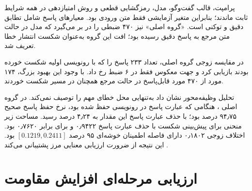 پرامپت، قالب گفت‌وگو، مدل، رمزگشایی قطعی و روش امتیازدهی در
همه شرایط ثابت ماندند؛ بنابراین متغیر آزمایشی فقط متن ورودی
 بود. معیارهای پاسخ شامل تطابق دقیق و  توکنی است.
«گروه اصلی» نیز ۴۷۰ ضبطی را در بر می‌گیرد که مدل در حالت متن
مرجع به پاسخ دقیق رسیده بود؛ افت این گروه به‌عنوان شکست انتشار
خطا تعریف شد.

\begin{table}[H]
\centering
\caption{مقایسه زوجی انتشار خطا در ۷۶۹ ضبط فارسی }
\label{tab:propagation_results}
\end{table}

در مقایسه زوجی گروه اصلی،  تعداد ۲۳۳ پاسخ را که با
رونویسی اولیه شکست خورده بودند بازیابی کرد و جهت معکوس فقط در
۶ ضبط رخ داد. با وجود این بهبود بزرگ، ۱۷۴ مورد از ۴۷۰ مورد
قابل‌پاسخ در حالت مرجع همچنان در مسیر  شکست خوردند.

تحلیل وظیفه‌محور نشان داد  به‌تنهایی محل خطای مهم را
توصیف نمی‌کند. در گروه اصلی ، هنگامی که عبارت پاسخ در
رونویسی حفظ شده بود، نرخ حفظ پاسخ صحیح ۹۴٫۷۵ درصد بود؛ با حذف
عبارت پاسخ این مقدار به ۴٫۲۴ درصد رسید. مساحت زیر منحنی برای
پیش‌بینی شکست با حذف عبارت پاسخ ۰٫۹۴۲۲ و برای  برابر
۰٫۷۶۲۰ بود. اختلاف زوجی ۰٫۱۸۰۲ دارای فاصله اطمینان خوشه‌ای ۹۵
درصد $[0.1219,0.2411]$ بود. این نتیجه از ضرورت ارزیابی معنایی
مرز  پشتیبانی می‌کند \cite{faruqui2022boundary}.


\section{ارزیابی مرحله‌ای افزایش مقاومت}


